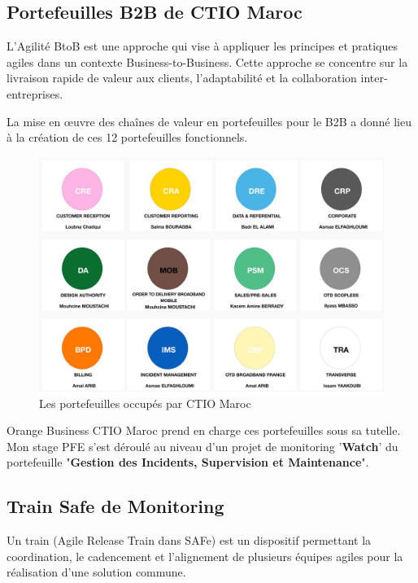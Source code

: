 \subsection{Portefeuilles B2B de CTIO Maroc}

L'Agilité BtoB est une approche qui vise à appliquer les principes et pratiques agiles dans un contexte Business-to-Business. 
Cette approche se concentre sur la livraison rapide de valeur aux clients, l'adaptabilité et la collaboration inter-entreprises.

\medskip

La mise en œuvre des chaînes de valeur en portefeuilles pour le B2B a donné lieu à la création de ces 12 portefeuilles fonctionnels.

\begin{figure}[h]
    \centering
    \includegraphics[width=1\textwidth]{images/ctio_portefeuilles.png}
    \caption{Les portefeuilles occupés par CTIO Maroc}
    \label{fig:ctio_portefeuilles}
\end{figure}

\medskip

Orange Business CTIO Maroc prend en charge ces portefeuilles sous sa tutelle.
Mon stage PFE s’est déroulé au niveau d’un projet de monitoring '\textbf{Watch}' du portefeuille "\textbf{Gestion des Incidents, Supervision et Maintenance}".

\subsection{Train Safe de Monitoring}
Un train (Agile Release Train dans SAFe) est un dispositif permettant la coordination, le cadencement et l’alignement de plusieurs équipes agiles pour la réalisation d’une solution commune. 

